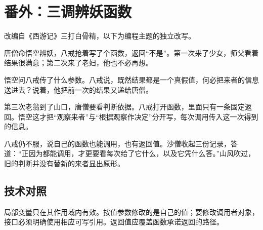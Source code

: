 \section{番外：三调辨妖函数}

改编自《西游记》三打白骨精，以下为编程主题的独立改写。

唐僧命悟空辨妖，八戒抢着写了个函数，返回“不是”。第一次来了少女，师父看着结果很满意；第二次来了老妇，他也不必再想。

悟空问八戒传了什么参数。八戒说，既然结果都是一个真假值，何必把来者的信息送进去？说着，他把前一次的结果又递给唐僧。

第三次老翁到了山口，唐僧要看判断依据。八戒打开函数，里面只有一条固定返回。悟空这才把“观察来者”与“根据观察作决定”分开写，每次调用传入这一次得到的信息。

八戒仍不服，说自己的函数也能调用，也有返回值。沙僧收起三份记录，答道：“正因为都能调用，才更要看每次给了它什么，以及它凭什么答。”山风吹过，旧的判断并没有替新的来者显出原形。

\subsection*{技术对照}

局部变量只在其作用域内有效。按值参数修改的是自己的值；要修改调用者对象，接口必须明确使用相应可写引用。返回值应覆盖函数承诺返回的路径。
